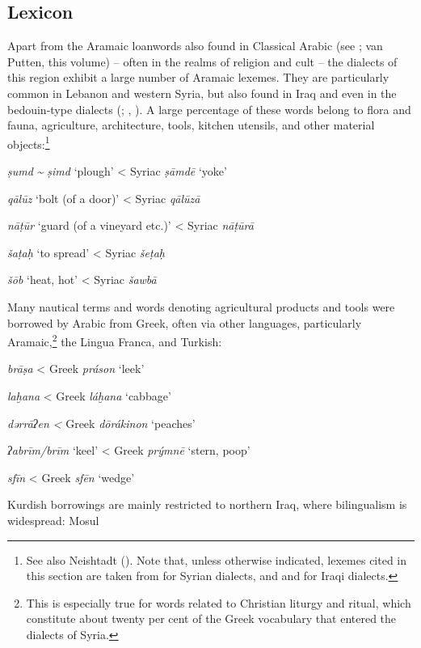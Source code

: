 \documentclass[output=paper]{langsci/langscibook}
\begin{document}
  \subsection{Lexicon} 
Apart from the Aramaic loanwords also found in Classical Arabic (see \citealt{Retsö2011}; van Putten, this volume) – often in the realms of religion and cult – the dialects of this region exhibit a large number of Aramaic lexemes. They are particularly common in Lebanon and western Syria, but also found in Iraq and even in the bedouin-type dialects (\citealt{Féghali1918}; \citealt{Borg2004}, \citeyear{Borg2008}). A large percentage of these words belong to flora and fauna, agriculture, architecture, tools, kitchen utensils, and other material objects:\footnote{See also Neishtadt (\citeyear[282]{Neishtadt2015}). Note that, unless otherwise indicated, lexemes cited in this section are taken from \citet{Barthélemy1935} for Syrian dialects, and \citet{WoodheadBeene1967} and \citet{alBakri1972} for Iraqi dialects.}

\ea
\textit{ṣumd} \textit{{\textasciitilde} ṣimd} ‘plough’ < Syriac \textit{ṣāmdē} ‘yoke’

\textit{qālūz} ‘bolt (of a door)’ < Syriac \textit{qālūzā}

\textit{nāṭūr} ‘guard (of a vineyard etc.)’ < Syriac \textit{nāṭūrā}

\textit{šaṭaḥ} ‘to spread’ < Syriac \textit{šeṭaḥ}

\textit{šōb} ‘heat, hot’ < Syriac \textit{šawbā}
\z

Many nautical terms and words denoting agricultural products and tools were borrowed by Arabic from Greek, often via other languages, particularly Aramaic,\footnote{This is especially true for words related to Christian liturgy and ritual, which constitute about twenty per cent of the Greek vocabulary that entered the dialects of Syria.} the Lingua Franca, and Turkish: 

\ea
\textit{brāṣa} < Greek \textit{práson} ‘leek’ 

\textit{laḫana} < Greek \textit{láḫana} ‘cabbage’

\textit{dərrāʔen} \textit{<} Greek \textit{dōrákinon} ‘peaches’

\textit{ʔabrīm/brīm} ‘keel’ < Greek \textit{prýmnē} ‘stern, poop’

\textit{sfīn} < Greek \textit{sfēn} ‘wedge’
\z

Kurdish borrowings are mainly restricted to northern Iraq, where bilingualism is widespread: 
\ea
Mosul
\end{document}
